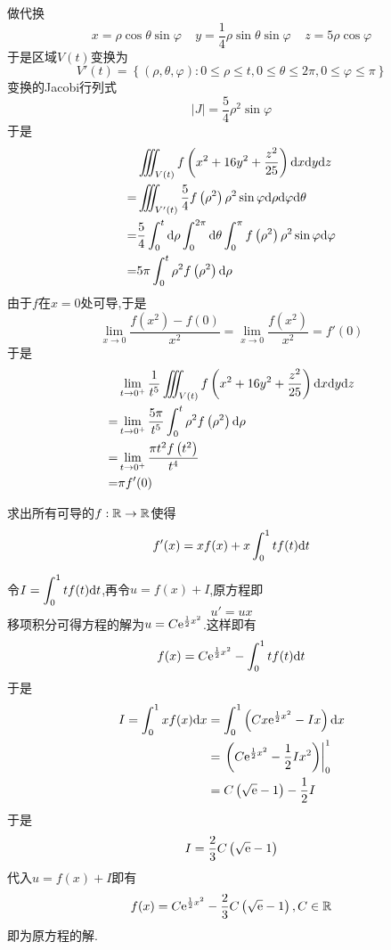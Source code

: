 \documentclass{ctexart}
\begin{document}
\begin{solution}
    做代换
    \[x=\rho\cos\theta\sin\varphi\ \ \ \ \ y=\dfrac14\rho\sin\theta\sin\varphi\ \ \ \ \ z=5\rho\cos\varphi\]
    于是区域$V(t)$变换为
    \[V'(t)=\left\{(\rho,\theta,\varphi):0\leqslant\rho\leqslant t,0\leqslant\theta\leqslant2\pi,0\leqslant\varphi\leqslant\pi\right\}\]
    变换的Jacobi行列式
    \[\left|J\right|=\dfrac{5}{4}\rho^2\sin\varphi\]
    于是
    \[\begin{aligned}
        &\iiint_{V(t)}f\left(x^2+16y^2+\dfrac{z^2}{25}\right)\mathrm{d} x\mathrm{d} y\mathrm{d} z \\
        =&\iiint_{V'(t)}\dfrac54f\left(\rho^2\right)\rho^2\sin\varphi\mathrm{d}\rho\mathrm{d}\varphi\mathrm{d}\theta \\
        =&\dfrac54\int_0^t\mathrm{d}\rho\int_0^{2\pi}\mathrm{d}\theta\int_0^\pi f\left(\rho^2\right)\rho^2\sin\varphi\mathrm{d}\varphi \\
        =&5\pi\int_0^{t}\rho^2f\left(\rho^2\right)\mathrm{d}\rho
    \end{aligned}\]
    由于$f$在$x=0$处可导,于是
    \[\lim_{x\to0}\dfrac{f\left(x^2\right)-f(0)}{x^2}=\lim_{x\to0}\dfrac{f\left(x^2\right)}{x^2}=f'(0)\]
    于是
    \[\begin{aligned}
        &\lim_{t\to0^+}\dfrac{1}{t^5}\iiint_{V(t)}f\left(x^2+16y^2+\dfrac{z^2}{25}\right)\mathrm{d} x\mathrm{d} y\mathrm{d} z \\
        =&\lim_{t\to0^+}\dfrac{5\pi}{t^5}\int_0^{t}\rho^2f\left(\rho^2\right)\mathrm{d}\rho \\
        =&\lim_{t\to0^+}\dfrac{\pi t^2f\left(t^2\right)}{t^4} \\
        =&\pi f'(0)
    \end{aligned}\]

\end{solution}
\begin{problem}[9.(15\songti{分})]
    求出所有可导的$f:\mathbb{R}\to\mathbb{R}$使得
    \[f'(x)=xf(x)+x\int_0^1tf(t)\mathrm{d} t\]
    
\end{problem}
\begin{solution}
    令$I=\displaystyle\int_0^1tf(t)\mathrm{d} t$,再令$u=f(x)+I$,原方程即
    \[u'=ux\]
    移项积分可得方程的解为$u=C\mathrm{e}^{\frac12x^2}$.这样即有
    \[f(x)=C\mathrm{e}^{\frac12x^2}-\int_0^{1}tf(t)\mathrm{d} t\]
    于是
    \[\begin{aligned}
        I=\int_0^1xf(x)\mathrm{d} x
        &= \int_0^1\left(Cx\mathrm{e}^{\frac12x^2}-Ix\right)\mathrm{d} x \\
        &= \left.\left(C\mathrm{e}^{\frac12x^2}-\dfrac{1}{2}Ix^2\right)\right|_0^1 \\
        &= C\left(\sqrt{\mathrm{e}}-1\right)-\dfrac{1}{2}I
    \end{aligned}\]
    于是
    \[I=\dfrac{2}{3}C\left(\sqrt{\mathrm{e}}-1\right)\]
    代入$u=f(x)+I$即有
    \[f(x)=C\mathrm{e}^{\frac12x^2}-\dfrac{2}{3}C\left(\sqrt{\mathrm{e}}-1\right),C\in\mathbb{R}\]
    即为原方程的解.
\end{solution}
\end{document}

